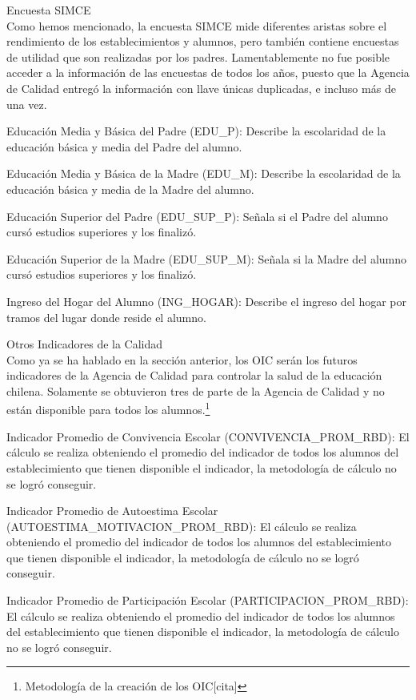 \begin{longdescription}
  \item[Encuesta SIMCE] \hfill \\
    Como hemos mencionado, la encuesta SIMCE mide diferentes aristas sobre el rendimiento de los establecimientos y alumnos, pero también contiene encuestas de utilidad que son realizadas por los padres. Lamentablemente no fue posible acceder a la información de las encuestas de todos los años, puesto que la Agencia de Calidad entregó la información con llave únicas duplicadas, e incluso más de una vez.
     \begin{longdescription}
        \item[Educación Media y Básica del Padre](EDU\_P): Describe la escolaridad de la educación básica y media del Padre del alumno.
        \item[Educación Media y Básica de la Madre](EDU\_M): Describe la escolaridad de la educación básica y media de la Madre del alumno.
        \item[Educación Superior del Padre](EDU\_SUP\_P): Señala si el Padre del alumno cursó estudios superiores y los finalizó.
        \item[Educación Superior de la Madre](EDU\_SUP\_M): Señala si la Madre del alumno cursó estudios superiores y los finalizó.
        \item[Ingreso del Hogar del Alumno](ING\_HOGAR): Describe el ingreso del hogar por tramos del lugar donde reside el alumno.
     \end{longdescription}
  \item[Otros Indicadores de la Calidad] \hfill \\
    Como ya se ha hablado en la sección anterior, los OIC serán los futuros indicadores de la Agencia de Calidad para controlar la salud de la educación chilena. Solamente se obtuvieron tres de parte de la Agencia de Calidad y no están disponible para todos los alumnos.\footnote{Metodología de la creación de los OIC[cita]}
       \begin{longdescription}
        \item[Indicador Promedio de Convivencia Escolar](CONVIVENCIA\_PROM\_RBD): El cálculo se realiza obteniendo el promedio del indicador de todos los alumnos del establecimiento que tienen disponible el indicador, la metodología de cálculo no se logró conseguir.
        \item[Indicador Promedio de Autoestima Escolar](AUTOESTIMA\_MOTIVACION\_PROM\_RBD): El cálculo se realiza obteniendo el promedio del indicador de todos los alumnos del establecimiento que tienen disponible el indicador, la metodología de cálculo no se logró conseguir.
        \item[Indicador Promedio de Participación Escolar](PARTICIPACION\_PROM\_RBD): El cálculo se realiza obteniendo el promedio del indicador de todos los alumnos del establecimiento que tienen disponible el indicador, la metodología de cálculo no se logró conseguir.
       \end{longdescription}
\end{longdescription}